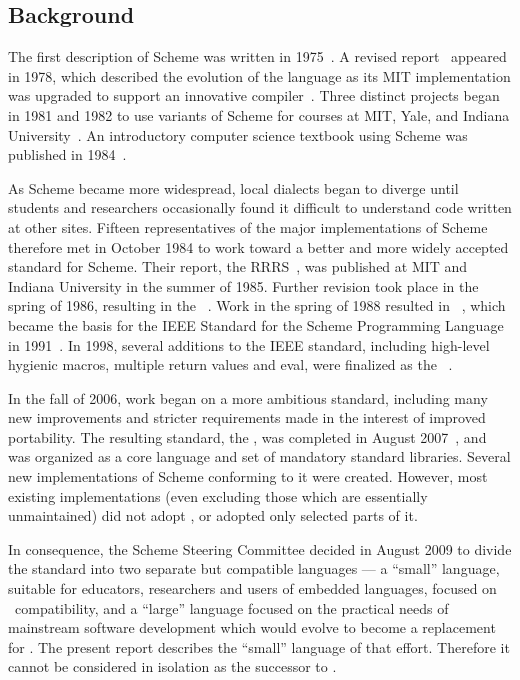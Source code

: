 \subsection*{Background}

\vest The first description of Scheme was written in
1975~\cite{Scheme75}.  A revised report~\cite{Scheme78}
appeared in 1978, which described the evolution
of the language as its MIT implementation was upgraded to support an
innovative compiler~\cite{Rabbit}.  Three distinct projects began in
1981 and 1982 to use variants of Scheme for courses at MIT, Yale, and
Indiana University~\cite{Rees82,MITScheme,Scheme311}.  An introductory
computer science textbook using Scheme was published in
1984~\cite{SICP}.

\vest As Scheme became more widespread,
local dialects began to diverge until students and researchers
occasionally found it difficult to understand code written at other
sites.
Fifteen representatives of the major implementations of Scheme therefore
met in October 1984 to work toward a better and more widely accepted
standard for Scheme.
Their report, the RRRS~\cite{RRRS},
was published at MIT and Indiana University in the summer of 1985.
Further revision took place in the spring of 1986, resulting in the
\rthreers~\cite{R3RS}.
Work in the spring of 1988 resulted in \rfourrs~\cite{R4RS},
which became the basis for the
IEEE Standard for the Scheme Programming Language in 1991~\cite{IEEEScheme}.
In 1998, several additions to the IEEE standard, including high-level
hygienic macros, multiple return values and {\cf eval}, were finalized
as the \rfivers~\cite{R5RS}.


In the fall of 2006, work began on a more ambitious standard,
including many new improvements and stricter requirements made in the
interest of improved portability.  The resulting standard, the
\rsixrs, was completed in August 2007~\cite{R6RS}, and was organized
as a core language and set of mandatory standard libraries.  
Several new implementations of Scheme conforming to it were created.
However, most existing \rfivers{} implementations (even excluding those
which are essentially unmaintained) did not adopt \rsixrs, or adopted
only selected parts of it.

In consequence, the Scheme Steering Committee decided in August 2009 to divide the
standard into two separate but compatible languages --- a ``small''
language, suitable for educators, researchers and users of embedded languages,
focused on \rfivers~compatibility, and a ``large'' language focused
on the practical needs of mainstream software development
which would evolve to become a replacement for \rsixrs.
The present report describes the ``small'' language of that effort.
Therefore it cannot be considered in isolation as the successor
to \rsixrs.



